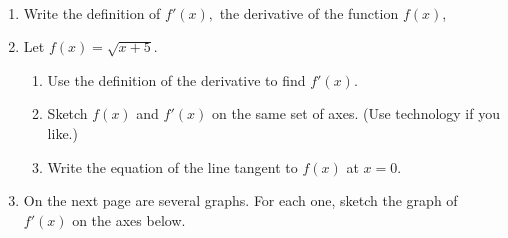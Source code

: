 \documentclass[11pt,fleqn]{article}
\begin{document}
\renewcommand{\headrulewidth}{0pt}
\newcommand{\blank}[1]{\rule{#1}{0.75pt}}
\newcommand{\bc}{\begin{center}}
\newcommand{\ec}{\end{center}}
\renewcommand{\d}{\displaystyle}

\vspace*{-0.7in}

\begin{center}
  \large
  \\
\end{center}
\begin{enumerate}
\item Write the definition of $f'(x),$ the derivative of the function $f(x)$,\\
\vspace{.7in}
\item Let $f(x)=\sqrt{x+5}.$
\begin{enumerate}
	\item Use the definition of the derivative to find $f'(x).$
	\vspace{3in}
	\item Sketch $f(x)$ and $f'(x)$ on the same set of axes. (Use technology if you like.)
	\vspace{2in}
	\item Write the equation of the line tangent to $f(x)$ at $x=0.$
	\vspace{1in}
	\end{enumerate}

\item On the next page are several graphs. For each one, sketch the graph of $f'(x)$ on the axes below.
\newpage
\vspace*{-.5in}
\begin{tabular}[c]{c  c }


\end{tabular}
\end{enumerate}
\end{document}
